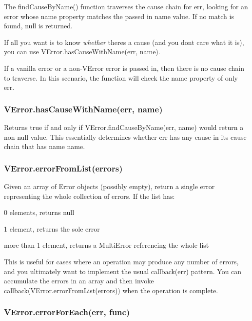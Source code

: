 The {\ttfamily find\+Cause\+By\+Name()} function traverses the cause chain for {\ttfamily err}, looking for an error whose {\ttfamily name} property matches the passed in {\ttfamily name} value. If no match is found, {\ttfamily null} is returned.

If all you want is to know {\itshape whether} there\textquotesingle{}s a cause (and you don\textquotesingle{}t care what it is), you can use {\ttfamily V\+Error.\+has\+Cause\+With\+Name(err, name)}.

If a vanilla error or a non-\/\+V\+Error error is passed in, then there is no cause chain to traverse. In this scenario, the function will check the {\ttfamily name} property of only {\ttfamily err}.

\subsubsection*{{\ttfamily V\+Error.\+has\+Cause\+With\+Name(err, name)}}

Returns true if and only if {\ttfamily V\+Error.\+find\+Cause\+By\+Name(err, name)} would return a non-\/null value. This essentially determines whether {\ttfamily err} has any cause in its cause chain that has name {\ttfamily name}.

\subsubsection*{{\ttfamily V\+Error.\+error\+From\+List(errors)}}

Given an array of Error objects (possibly empty), return a single error representing the whole collection of errors. If the list has\+:


\begin{DoxyItemize}
\item 0 elements, returns {\ttfamily null}
\item 1 element, returns the sole error
\item more than 1 element, returns a Multi\+Error referencing the whole list
\end{DoxyItemize}

This is useful for cases where an operation may produce any number of errors, and you ultimately want to implement the usual {\ttfamily callback(err)} pattern. You can accumulate the errors in an array and then invoke {\ttfamily callback(V\+Error.\+error\+From\+List(errors))} when the operation is complete.

\subsubsection*{{\ttfamily V\+Error.\+error\+For\+Each(err, func)}}

